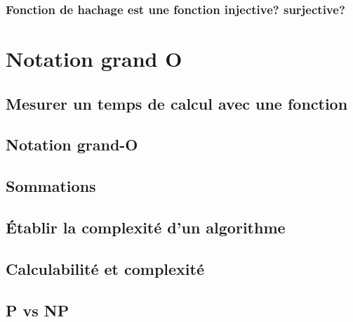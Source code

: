 \documentclass[
  letterpaper,
]{scrbook}
\theoremstyle{definition}
\theoremstyle{definition}
\theoremstyle{plain}
\theoremstyle{remark}
\begin{document}
\hypertarget{fonction-de-hachage-est-une-fonction-injective-surjective}{%
\subsection{Fonction de hachage est une fonction injective?
surjective?}\label{fonction-de-hachage-est-une-fonction-injective-surjective}}


\hypertarget{notation-grand-o}{%
\chapter{Notation grand O}\label{notation-grand-o}}

\hypertarget{mesurer-un-temps-de-calcul-avec-une-fonction}{%
\section{Mesurer un temps de calcul avec une
fonction}\label{mesurer-un-temps-de-calcul-avec-une-fonction}}

\hypertarget{notation-grand-o-1}{%
\section{Notation grand-O}\label{notation-grand-o-1}}

\hypertarget{sommations}{%
\section{Sommations}\label{sommations}}

\hypertarget{uxe9tablir-la-complexituxe9-dun-algorithme}{%
\section{Établir la complexité d'un
algorithme}\label{uxe9tablir-la-complexituxe9-dun-algorithme}}

\hypertarget{calculabilituxe9-et-complexituxe9}{%
\section{Calculabilité et
complexité}\label{calculabilituxe9-et-complexituxe9}}

\hypertarget{p-vs-np}{%
\section{P vs NP}\label{p-vs-np}}
\end{document}

